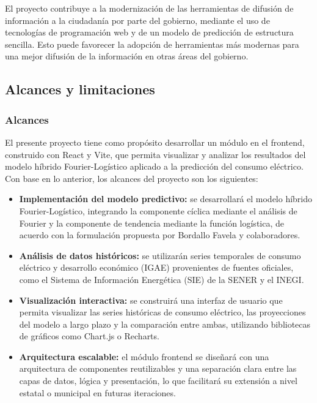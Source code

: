 El proyecto contribuye a la modernización de las herramientas de difusión de información a la ciudadanía por parte del gobierno, mediante el uso de tecnologías de programación web y de un modelo de predicción de estructura sencilla. Esto puede favorecer la adopción de herramientas más modernas para una mejor difusión de la información en otras áreas del gobierno.

\subsection{Alcances y limitaciones} \label{sec:alcances_limitaciones} %

\subsubsection{Alcances} \label{subsec:alcances}
El presente proyecto tiene como propósito desarrollar un módulo en el frontend, construido con React y Vite, que permita visualizar y analizar los resultados del modelo híbrido Fourier-Logístico aplicado a la predicción del consumo eléctrico. Con base en lo anterior, los alcances del proyecto son los siguientes:

\begin{itemize}
    \item \textbf{Implementación del modelo predictivo:} se desarrollará el modelo híbrido Fourier-Logístico, integrando la componente cíclica mediante el análisis de Fourier y la componente de tendencia mediante la función logística, de acuerdo con la formulación propuesta por Bordallo Favela y colaboradores.
    
    \item \textbf{Análisis de datos históricos:} se utilizarán series temporales de consumo eléctrico y desarrollo económico (IGAE) provenientes de fuentes oficiales, como el Sistema de Información Energética (SIE) de la SENER y el INEGI.
    
    \item \textbf{Visualización interactiva:} se construirá una interfaz de usuario que permita visualizar las series históricas de consumo eléctrico, las proyecciones del modelo a largo plazo y la comparación entre ambas, utilizando bibliotecas de gráficos como Chart.js o Recharts.
    
    \item \textbf{Arquitectura escalable:} el módulo frontend se diseñará con una arquitectura de componentes reutilizables y una separación clara entre las capas de datos, lógica y presentación, lo que facilitará su extensión a nivel estatal o municipal en futuras iteraciones.
\end{itemize}

